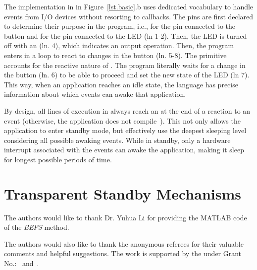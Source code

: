 The implementation in \CEU in Figure~\ref{lst.basic}.b
uses dedicated vocabulary to handle events from I/O devices without resorting
to callbacks.
The pins are first declared to determine their purpose in the program, i.e.,
 for the pin connected to the button and   for the pin
connected to the LED (ln 1-2).
Then, the LED is turned off with an  (ln. 4), which indicates an
output operation.
Then, the program enters in a loop to react to changes in the button (ln. 5-8).
The  primitive accounts for the reactive nature of \CEU.
The program literally waits for a change in the button (ln. 6) to be able to
proceed and set the new state of the LED (ln 7).
%
This way, when an application reaches an idle state, the language has precise
information about which events can awake that application.

By design, all lines of execution in \CEU always reach an  at the
end of a reaction to an event (otherwise, the application does not
compile~\cite{ceu.sensys13}).
%
This not only allows the application to enter standby mode, but effectively use
the deepest sleeping level considering all possible awaking events.
While in standby, only a hardware interrupt associated with the events can
awake the application, making it sleep for longest possible periods of time.
%

\section{Transparent Standby Mechanisms}
\label{sec.ceu}

\begin{acks}
  The authors would like to thank Dr. Yuhua Li for providing the
  MATLAB code of the \textit{BEPS} method.

  The authors would also like to thank the anonymous referees for
  their valuable comments and helpful suggestions. The work is
  supported by the  under Grant
  No.:~
  and~.

\end{acks}
